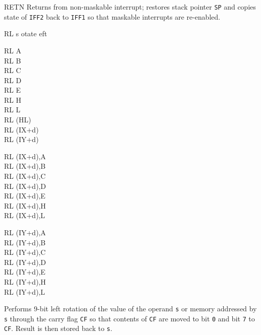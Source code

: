 \documentclass[12pt,twoside,openright,a4paper]{book}
\begin{document}
\begin{basedescript}{
	\desclabelstyle{\multilinelabel}
	\desclabelwidth{3cm}}
\begin{DetailItem}{RETN}
		Returns from non-maskable interrupt; restores stack pointer {\tt SP} and copies state of {\tt IFF2} back to {\tt IFF1} so that maskable interrupts are re-enabled.

		\begin{DetailEffects}
			\FlagsRETN
		\end{DetailEffects}
				
		\begin{DetailTiming}
		\end{DetailTiming}

	\end{DetailItem}

	\begin{DetailItem}{RL s}
		{otate eft}
		{}

		\begin{DetailVariants}
			RL A\\
			RL B\\
			RL C\\
			RL D\\
			RL E\\
			RL H\\
			RL L\\
			RL (HL)\\
			RL (IX+d)\\
			RL (IY+d)

			\columnbreak
			RL (IX+d),A\UNDOC\\
			RL (IX+d),B\UNDOC\\
			RL (IX+d),C\UNDOC\\
			RL (IX+d),D\UNDOC\\
			RL (IX+d),E\UNDOC\\
			RL (IX+d),H\UNDOC\\
			RL (IX+d),L\UNDOC

			\columnbreak
			RL (IY+d),A\UNDOC\\
			RL (IY+d),B\UNDOC\\
			RL (IY+d),C\UNDOC\\
			RL (IY+d),D\UNDOC\\
			RL (IY+d),E\UNDOC\\
			RL (IY+d),H\UNDOC\\
			RL (IY+d),L\UNDOC
		\end{DetailVariants}

		Performs 9-bit left rotation of the value of the operand {\tt s} or memory addressed by {\tt s} through the carry flag {\tt CF} so that contents of {\tt CF} are moved to bit {\tt 0} and bit {\tt 7} to {\tt CF}. Result is then stored back to {\tt s}.


\end{DetailItem}
\end{basedescript}
\end{document}
